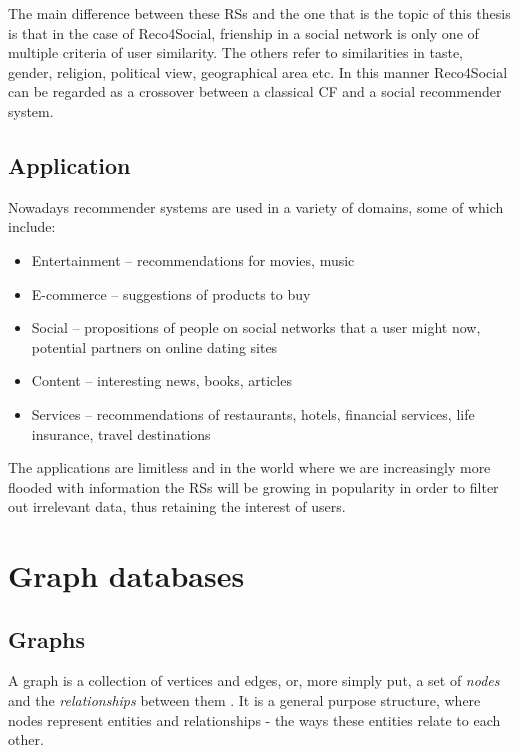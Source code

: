 \documentclass[12pt]{report}
\begin{document}
The main difference between these RSs and the one that is the topic of this thesis is that in the case of Reco4Social, frienship in a social network is only one of multiple criteria of user similarity. The others refer to similarities in taste, gender, religion, political view, geographical area etc. In this manner Reco4Social can be regarded as a crossover between a classical CF and a social recommender system.

\subsection{Application}

Nowadays recommender systems are used in a variety of domains, some of which include:
\begin{itemize}
\item Entertainment -- recommendations for movies, music
\item E-commerce -- suggestions of products to buy
\item Social -- propositions of people on social networks that a user might now, potential partners on online dating sites
\item Content -- interesting news, books, articles
\item Services -- recommendations of restaurants, hotels, financial services, life insurance, travel destinations
\end{itemize}

The applications are limitless and in the world where we are increasingly more flooded with information the RSs will be growing in popularity in order to filter out irrelevant data, thus retaining the interest of users.

\section{Graph databases}

\subsection{Graphs}

A graph is a collection of vertices and edges, or, more simply put, a set of \textit{nodes} and the \textit{relationships} between them \cite{graph_databases}. It is a general purpose structure, where nodes represent entities and relationships - the ways these entities relate to each other.
\end{document}
